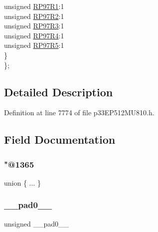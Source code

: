 \begin{DoxyCompactItemize}
\begin{tabbing}
\>\>unsigned \hyperlink{structtag_r_p_o_r7_b_i_t_s_ad202bafad09d9cbdf02058eb8738cf33}{RP97R1}:1\\
\>\>unsigned \hyperlink{structtag_r_p_o_r7_b_i_t_s_ae76e836ccf1416750ec49611225fa7a7}{RP97R2}:1\\
\>\>unsigned \hyperlink{structtag_r_p_o_r7_b_i_t_s_a8f6ebbe4aba2a7f31f4202464ddb5a27}{RP97R3}:1\\
\>\>unsigned \hyperlink{structtag_r_p_o_r7_b_i_t_s_ab2370f7309952ecaab9739b29663df8f}{RP97R4}:1\\
\>\>unsigned \hyperlink{structtag_r_p_o_r7_b_i_t_s_a45734e24cc1b2198c36c7aa1b3fc2188}{RP97R5}:1\\
\>\} \\
\}; \\

\end{tabbing}\end{DoxyCompactItemize}


\subsection{Detailed Description}


Definition at line 7774 of file p33\+E\+P512\+M\+U810.\+h.



\subsection{Field Documentation}
\mbox{\label{structtag_r_p_o_r7_b_i_t_s_a3ec5babd68628e4b674ef399757e6c9b}} 
\subsubsection{\texorpdfstring{"@1365}{@1365}}
{\footnotesize\ttfamily union \{ ... \} }

\mbox{\label{structtag_r_p_o_r7_b_i_t_s_adf71f3d8410c1f1dbbc96680a92c49af}} 
\subsubsection{\texorpdfstring{\+\_\+\+\_\+pad0\+\_\+\+\_\+}{\_\_pad0\_\_}}
{\footnotesize\ttfamily unsigned \+\_\+\+\_\+pad0\+\_\+\+\_\+}



